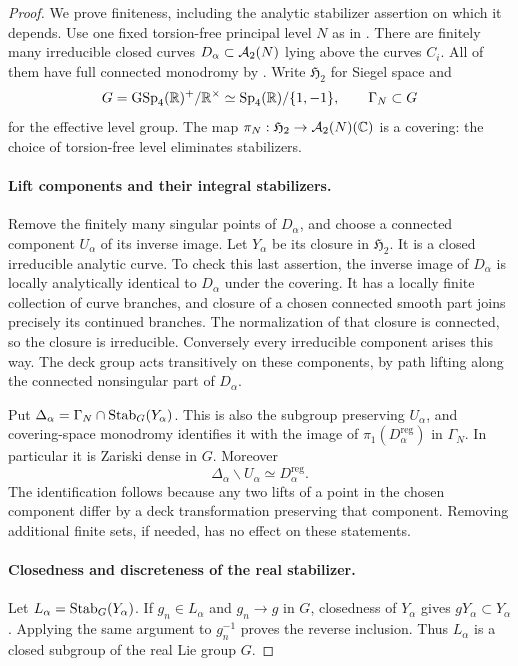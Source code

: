 \begin{proof}
We prove finiteness, including the analytic stabilizer assertion
on which it depends.  Use one fixed torsion-free principal level $N$ as
in .  There are finitely many irreducible closed
curves $D_\alpha\subset\mathcal A_2(N)$ lying above the curves $C_i$.
All of them have full connected monodromy by
.  Write $\mathfrak H_2$ for Siegel space and
\[
 G=\operatorname{GSp}_4(\mathbb R)^+/\mathbb R^\times
     \simeq\operatorname{Sp}_4(\mathbb R)/\{1,-1\},
 \qquad \Gamma_N\subset G
\]
for the effective level group.  The map
$\pi_N:\mathfrak H_2\to\mathcal A_2(N)(\mathbb C)$ is a covering: the choice
of torsion-free level eliminates stabilizers.

\paragraph{Lift components and their integral stabilizers.}
Remove the finitely many singular points of $D_\alpha$, and
choose a connected component $U_\alpha$ of its inverse image.
Let $Y_\alpha$ be its closure in $\mathfrak H_2$.  It is a
closed irreducible analytic curve.  To check this last assertion,
the inverse image of $D_\alpha$ is locally analytically identical
to $D_\alpha$ under the covering.  It has a locally finite
collection of curve branches, and closure of a chosen connected
smooth part joins precisely its continued branches.  The
normalization of that closure is connected, so the closure is
irreducible.  Conversely every irreducible component arises this
way.  The deck group acts transitively on these components, by
path lifting along the connected nonsingular part of
$D_\alpha$.

Put $\Delta_\alpha=\Gamma_N\cap\operatorname{Stab}_G(Y_\alpha)$.  This is
also the subgroup preserving $U_\alpha$, and covering-space
monodromy identifies it with the image of
$\pi_1(D_\alpha^{\mathrm{reg}})$ in $\Gamma_N$.  In particular
it is Zariski dense in $G$.  Moreover
\begin{equation}\label{geo:lift-quotient}
 \Delta_\alpha\backslash U_\alpha
       \simeq D_\alpha^{\mathrm{reg}}.
\end{equation}
The identification follows because any two lifts of a point in
the chosen component differ by a deck transformation preserving
that component.  Removing additional finite sets, if needed,
has no effect on these statements.

\paragraph{Closedness and discreteness of the real stabilizer.}
Let $L_\alpha=\operatorname{Stab}_G(Y_\alpha)$.  If $g_n\in L_\alpha$ and
$g_n\to g$ in $G$, closedness of $Y_\alpha$ gives
$gY_\alpha\subset Y_\alpha$.  Applying the same argument to
$g_n^{-1}$ proves the reverse inclusion.  Thus $L_\alpha$ is a
closed subgroup of the real Lie group $G$.


\end{proof}
